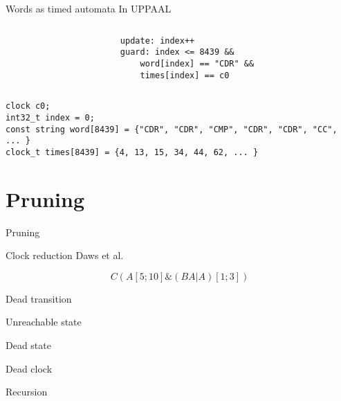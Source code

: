 \begin{frame}[fragile]{Words as timed automata}
    In UPPAAL
    \begin{columns}
        \begin{column}{0.5\textwidth}
            

        \end{column}
        \begin{column}{0.5\textwidth}
            \begin{lstlisting}[basicstyle=\tiny]
update: index++
guard: index <= 8439 &&
    word[index] == "CDR" &&
    times[index] == c0
            \end{lstlisting}
        \end{column}
    \end{columns}
    \begin{lstlisting}[basicstyle=\tiny]
clock c0;
int32_t index = 0;
const string word[8439] = {"CDR", "CDR", "CMP", "CDR", "CDR", "CC", ... }
clock_t times[8439] = {4, 13, 15, 34, 44, 62, ... }
    \end{lstlisting}
\end{frame}

\section{Pruning}
\begin{frame}[shrink=5]{Pruning}
    \begin{center}
        
    \end{center}
\end{frame}
\begin{frame}{Clock reduction}
    Daws et al.

    $$C(A[5;10]\&(BA|A)[1;3])$$
    
\end{frame}
\begin{frame}{Dead transition}
    
    
\end{frame}
\begin{frame}{Unreachable state}
    
    
\end{frame}
\begin{frame}{Dead state}
    
    
\end{frame}
\begin{frame}{Dead clock}
    
    
\end{frame}
\begin{frame}{Recursion}
    
    
    
\end{frame}

